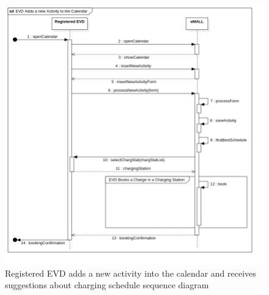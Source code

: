 \begin{center}
    \begin{figure} [H]
        \begin{center}
            \includegraphics[width=0.9\linewidth]{Images/SequenceDiagrams/evd_adds_a_new_activity_to_the_calendar}
            \caption{Registered EVD adds a new activity into the calendar and receives suggestions about charging schedule sequence diagram}
            \label{fig: evd_adds_activity_seq_diag}
        \end{center}
    \end{figure}
\end{center}

